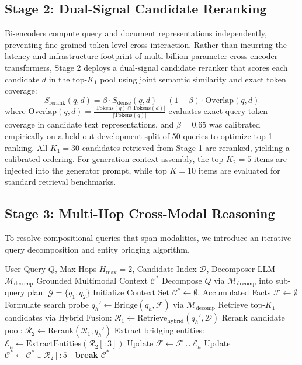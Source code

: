 \documentclass[conference]{IEEEtran}
\begin{document}
\subsection{Stage 2: Dual-Signal Candidate Reranking}
Bi-encoders compute query and document representations independently, preventing fine-grained token-level cross-interaction. Rather than incurring the latency and infrastructure footprint of multi-billion parameter cross-encoder transformers, Stage 2 deploys a dual-signal candidate reranker that scores each candidate $d$ in the top-$K_1$ pool using joint semantic similarity and exact token coverage:
\begin{equation}
    S_{\text{rerank}}(q, d) = \beta \cdot S_{\text{dense}}(q, d) + (1 - \beta) \cdot \text{Overlap}(q, d)
\end{equation}
where $\text{Overlap}(q, d) = \frac{|\text{Tokens}(q) \cap \text{Tokens}(d)|}{|\text{Tokens}(q)|}$ evaluates exact query token coverage in candidate text representations, and $\beta = 0.65$ was calibrated empirically on a held-out development split of 50 queries to optimize top-1 ranking. All $K_1 = 30$ candidates retrieved from Stage 1 are reranked, yielding a calibrated ordering. For generation context assembly, the top $K_2 = 5$ items are injected into the generator prompt, while top $K = 10$ items are evaluated for standard retrieval benchmarks.

\subsection{Stage 3: Multi-Hop Cross-Modal Reasoning}
To resolve compositional queries that span modalities, we introduce an iterative query decomposition and entity bridging algorithm.

\begin{algorithm}[h]
\caption{Multi-Hop Cross-Modal Retrieval Procedure}
\label{alg:multihop}
\begin{algorithmic}[1]
\REQUIRE User Query $Q$, Max Hops $H_{\max}=2$, Candidate Index $\mathcal{D}$, Decomposer LLM $\mathcal{M}_{\text{decomp}}$
\ENSURE Grounded Multimodal Context $\mathcal{C}^*$
\STATE Decompose $Q$ via $\mathcal{M}_{\text{decomp}}$ into sub-query plan: $\mathcal{G} = \{q_1, q_2\}$
\STATE Initialize Context Set $\mathcal{C}^* \leftarrow \emptyset$, Accumulated Facts $\mathcal{F} \leftarrow \emptyset$
    \STATE Formulate search probe $q_h' \leftarrow \text{Bridge}(q_h, \mathcal{F})$ via $\mathcal{M}_{\text{decomp}}$
    \STATE Retrieve top-$K_1$ candidates via Hybrid Fusion: $\mathcal{R}_1 \leftarrow \text{Retrieve}_{\text{hybrid}}(q_h', \mathcal{D})$
    \STATE Rerank candidate pool: $\mathcal{R}_2 \leftarrow \text{Rerank}(\mathcal{R}_1, q_h')$
    \STATE Extract bridging entities: $\mathcal{E}_h \leftarrow \text{ExtractEntities}(\mathcal{R}_2[:3])$
    \STATE Update $\mathcal{F} \leftarrow \mathcal{F} \cup \mathcal{E}_h$
    \STATE Update $\mathcal{C}^* \leftarrow \mathcal{C}^* \cup \mathcal{R}_2[:5]$
        \STATE \textbf{break}
    \ENDIF
\ENDFOR
\RETURN $\mathcal{C}^*$
\end{algorithmic}
\end{algorithm}
\end{document}

